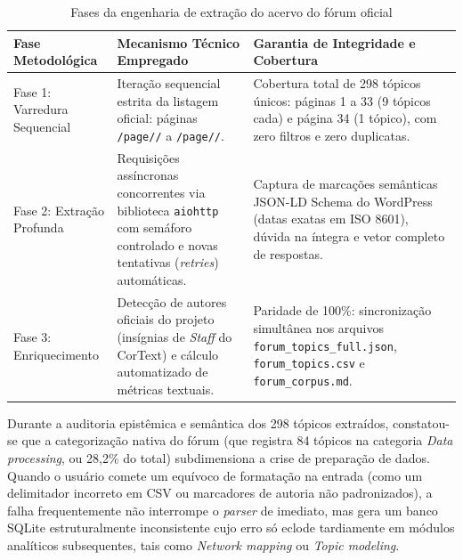 \documentclass[
	oneside,
	a4paper,
	12pt,
	chapter=TITLE,
	section=TITLE,
	english,
	brazilian
]{abntex2}
\begin{document}
\begin{table}[htb]
  \caption{Fases da engenharia de extração do acervo do fórum oficial}
  \label{tab:tabela_5}
  \centering
  \small
  \setlength{\tabcolsep}{4pt}
  \begin{tabularx}{\textwidth}{|>{\raggedright\arraybackslash}p{3.6cm}|>{\raggedright\arraybackslash}X|>{\raggedright\arraybackslash}X|}
    \hline
    \textbf{Fase Metodológica} & \textbf{Mecanismo Técnico Empregado} & \textbf{Garantia de Integridade e Cobertura} \\ \hline
    Fase 1: Varredura Sequencial & Iteração sequencial estrita da listagem oficial: páginas \texttt{/page/\allowbreak 1/} a \texttt{/page/\allowbreak 34/}. & Cobertura total de 298 tópicos únicos: páginas 1 a 33 (9 tópicos cada) e página 34 (1 tópico), com zero filtros e zero duplicatas. \\ \hline
    Fase 2: Extração Profunda & Requisições assíncronas concorrentes via biblioteca \texttt{aiohttp} com semáforo controlado e novas tentativas (\textit{retries}) automáticas. & Captura de marcações semânticas JSON-LD Schema do WordPress (datas exatas em ISO 8601), dúvida na íntegra e vetor completo de respostas. \\ \hline
    Fase 3: Enriquecimento & Detecção de autores oficiais do projeto (insígnias de \textit{Staff} do CorText) e cálculo automatizado de métricas textuais. & Paridade de 100\%: sincronização simultânea nos arquivos \texttt{forum\_\allowbreak topics\_\allowbreak full.\allowbreak json}, \texttt{forum\_\allowbreak topics.\allowbreak csv} e \texttt{forum\_\allowbreak corpus.\allowbreak md}. \\ \hline
  \end{tabularx}
\end{table}
\FloatBarrier


Durante a auditoria epistêmica e semântica dos 298 tópicos extraídos, constatou-se que a categorização nativa do fórum (que registra 84 tópicos na categoria \textit{Data processing}, ou 28,2\% do total) subdimensiona a crise de preparação de dados. Quando o usuário comete um equívoco de formatação na entrada (como um delimitador incorreto em CSV ou marcadores de autoria não padronizados), a falha frequentemente não interrompe o \textit{parser} de imediato, mas gera um banco SQLite estruturalmente inconsistente cujo erro só eclode tardiamente em módulos analíticos subsequentes, tais como \textit{Network mapping} ou \textit{Topic modeling}.
\end{document}
